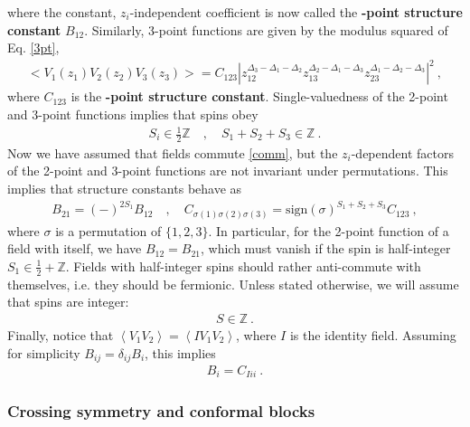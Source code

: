 \documentclass[12pt, a4paper]{article}
\newcommand{\myindex}[1]{\textbf{\boldmath #1}}
\theoremstyle{break}
\begin{document}
where the constant, $z_i$-independent coefficient is now called the \myindex{2-point structure constant} $B_{12}$. Similarly, 3-point functions are given by the modulus squared of Eq. \eqref{3pt},
\begin{align}
 \boxed{  \Big< V_1(z_1)V_2(z_2)V_3(z_3) \Big> = C_{123} \left|z_{12}^{\Delta_3-\Delta_1-\Delta_2} z_{13}^{\Delta_2-\Delta_1-\Delta_3} z_{23}^{\Delta_1-\Delta_2-\Delta_3}\right|^2 }\ ,
 \label{3ptc}
\end{align}
where $C_{123}$ is the \myindex{3-point structure constant}. Single-valuedness of the 2-point and 3-point functions implies that spins obey
\begin{align}
 S_i\in\frac12 \mathbb{Z} \quad , \quad S_1+S_2+S_3 \in\mathbb{Z}\ . 
 \label{sihz}
\end{align}
Now we have assumed that fields commute \eqref{comm}, but the $z_i$-dependent factors of the 2-point and 3-point functions are not invariant under permutations. This implies that structure constants behave as
\begin{align}
 B_{21} = (-)^{2S_1} B_{12} \quad ,\quad C_{\sigma(1)\sigma(2)\sigma(3)} = \text{sign}(\sigma)^{S_1+S_2+S_3} C_{123}\ , 
 \label{b21}
\end{align}
where $\sigma$ is a permutation of $\{1,2,3\}$. In particular, for the 2-point function of a field with itself, we have $B_{12}=B_{21}$, which must vanish if the spin is half-integer $S_1\in \frac12+\mathbb{Z}$. Fields with half-integer spins should rather anti-commute with themselves, i.e. they should be fermionic. 
Unless stated otherwise, we will assume that spins are integer:
\begin{align}
 \boxed{S\in \mathbb{Z}}\ .
 \label{siz}
\end{align}
Finally, notice that $\left<V_1V_2\right> = \left<IV_1V_2\right>$, where $I$ is the identity field. Assuming for simplicity $B_{ij}=\delta_{ij}B_i$, this implies 
\begin{align}
 \boxed{B_i = C_{Iii}}\ .
 \label{bicii}
\end{align}


\subsubsection{Crossing symmetry and conformal blocks}\label{sec:cscb}
\end{document}
